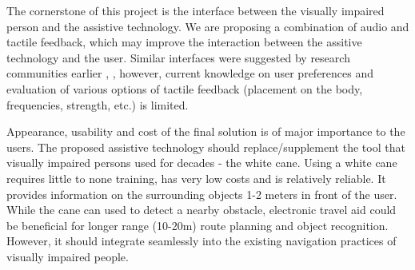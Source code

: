 \documentclass[10pt,conference,compsocconf]{IEEEtran}
\begin{document}
The cornerstone of this project is the interface between the visually impaired person and the assistive technology. We are proposing a combination of audio and tactile feedback, which may improve the interaction between the assitive technology and the user. Similar interfaces were suggested by research communities earlier \cite{Zientara}, \cite{Poggi}, however, current knowledge on user preferences and evaluation of various options of tactile feedback (placement on the body, frequencies, strength, etc.) is limited. 

Appearance, usability and cost of the final solution is of major importance to the users. The proposed assistive technology should replace/supplement the tool that visually impaired persons used for decades - the white cane. Using a white cane requires little to none training, has very low costs and is relatively reliable. It provides information on the surrounding objects 1-2 meters in front of the user. While the cane can used to detect a nearby obstacle, electronic travel aid could be beneficial for longer range (10-20m) route planning and object recognition. However, it should integrate seamlessly into the existing navigation practices of visually impaired people. 


 



\end{document}
